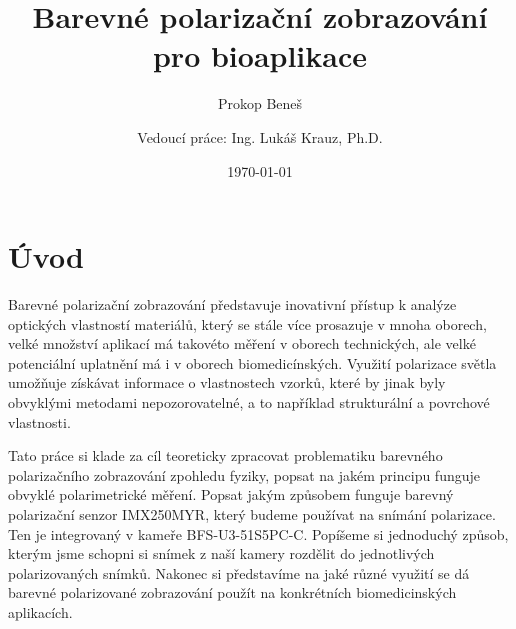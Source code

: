 \documentclass[a4paper]{article}
\title{Barevné polarizační zobrazování pro bioaplikace}
\author{Prokop Beneš}
\affil{BBPROJ04 - Bakalářský projekt}
\author{Vedoucí práce: Ing. Lukáš Krauz, Ph.D.}
\affil{Katedra Radioelektroniky, \\Fakulta Elektrotechnická, \\České Vysoké Učení v Praze}
\date{\today}
\numberwithin{equation}{section}
\begin{document}
	\maketitle
	\newpage

	\tableofcontents
	\newpage

    \section{Úvod}
    Barevné polarizační zobrazování představuje inovativní přístup k analýze optických vlastností materiálů,
    který se stále více prosazuje v mnoha oborech, velké množství aplikací má takovéto měření v oborech technických, ale velké potenciální uplatnění má i v oborech biomedicínských.\cite{biomedical,spie} Využití polarizace světla umožňuje získávat informace o vlastnostech vzorků, které by jinak byly obvyklými metodami nepozorovatelné, a to například strukturální a povrchové vlastnosti. \cite{photonics}
    \par Tato práce si klade za cíl teoreticky zpracovat problematiku barevného polarizačního zobrazování zpohledu fyziky, popsat na jakém principu funguje obvyklé polarimetrické měření. Popsat jakým způsobem funguje barevný polarizační senzor IMX250MYR, který budeme používat na snímání polarizace. Ten je integrovaný v kameře BFS-U3-51S5PC-C. Popíšeme si jednoduchý způsob, kterým jsme schopni si snímek z naší kamery rozdělit do jednotlivých polarizovaných snímků. Nakonec si představíme na jaké různé využití se dá barevné polarizované zobrazování použít na konkrétních biomedicinských aplikacích.   \footnotemark[1]\footnotemark[2]\footnotemark[3]%
	\newpage
        
\end{document}
